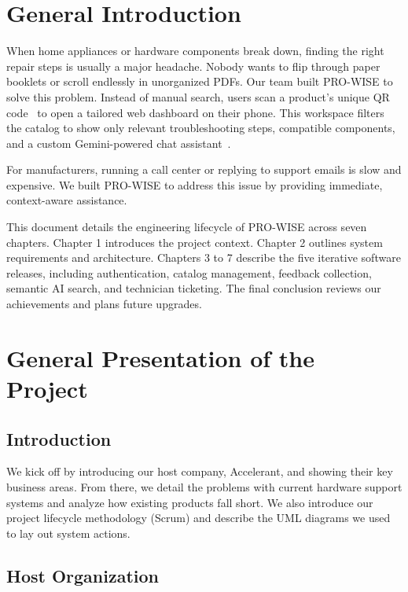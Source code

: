 \documentclass[12pt,a4paper]{report}
\begin{document}
\chapter*{General Introduction}

When home appliances or hardware components break down, finding the right repair steps is usually a major headache. Nobody wants to flip through paper booklets or scroll endlessly in unorganized PDFs. Our team built PRO-WISE to solve this problem. Instead of manual search, users scan a product's unique QR code~\cite{qrcode} to open a tailored web dashboard on their phone. This workspace filters the catalog to show only relevant troubleshooting steps, compatible components, and a custom Gemini-powered chat assistant~\cite{gemini}.

For manufacturers, running a call center or replying to support emails is slow and expensive. We built PRO-WISE to address this issue by providing immediate, context-aware assistance.

This document details the engineering lifecycle of PRO-WISE across seven chapters. Chapter 1 introduces the project context. Chapter 2 outlines system requirements and architecture. Chapters 3 to 7 describe the five iterative software releases, including authentication, catalog management, feedback collection, semantic AI search, and technician ticketing. The final conclusion reviews our achievements and plans future upgrades.


\cleardoublepage


\chapter{General Presentation of the Project}

\section{Introduction}

We kick off by introducing our host company, Accelerant, and showing their key business areas. From there, we detail the problems with current hardware support systems and analyze how existing products fall short. We also introduce our project lifecycle methodology (Scrum) and describe the UML diagrams we used to lay out system actions.

\section{Host Organization}
\end{document}
